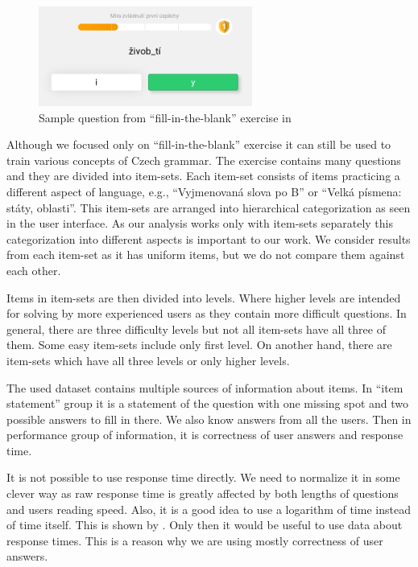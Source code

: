 \documentclass[
  digital, %
  table,   %
  nolof,     %
  nolot,     %
  nocover,
  color,
  final, %
]{fithesis3}
\begin{document}
\begin{figure}
  \includegraphics[width=7cm]{img/umimecesky_doplnovacka}
  \caption{Sample question from ``fill-in-the-blank'' exercise in \umimeCesky{}}
  \label{fig:umimeceskydoplnovacka}
\end{figure}

Although we focused only on ``fill-in-the-blank'' exercise it can still be used to train various concepts of Czech grammar. The exercise contains many questions and they are divided into item-sets. Each item-set consists of items practicing a different aspect of language, e.g., ``Vyjmenovaná slova po B'' or ``Velká písmena: státy, oblasti''. This item-sets are arranged into hierarchical categorization as seen in the user interface. As our analysis works only with item-sets separately this categorization into different aspects is important to our work. We consider results from each item-set as it has uniform items, but we do not compare them against each other.

Items in item-sets are then divided into levels. Where higher levels are intended for solving by more experienced users as they contain more difficult questions. In general, there are three difficulty levels but not all item-sets have all three of them. Some easy item-sets include only first level. On another hand, there are item-sets which have all three levels or only higher levels.


The used dataset contains multiple sources of information about items. In ``item statement'' group it is a statement of the question with one missing spot and two possible answers to fill in there. We also know answers from all the users. Then in performance group of information, it is correctness of user answers and response time.

It is not possible to use response time directly. We need to normalize it in some clever way as raw response time is greatly affected by both lengths of questions and users reading speed. Also, it is a good idea to use a logarithm of time instead of time itself. This is shown by \citeauthor{niznan2014using}\cite{niznan2014using}. Only then it would be useful to use data about response times. This is a reason why we are using mostly correctness of user answers.
\end{document}
